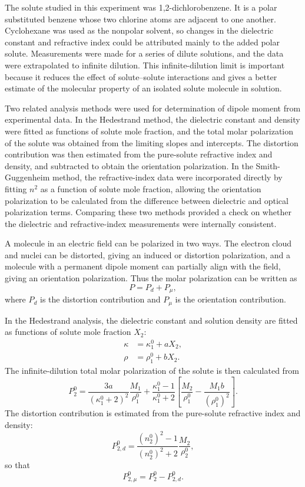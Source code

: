 \documentclass[11pt]{article}
\begin{document}
The solute studied in this experiment was 1,2-dichlorobenzene. It is a polar substituted benzene whose two chlorine atoms are adjacent to one another. Cyclohexane was used as the nonpolar solvent, so changes in the dielectric constant and refractive index could be attributed mainly to the added polar solute. Measurements were made for a series of dilute solutions, and the data were extrapolated to infinite dilution. This infinite-dilution limit is important because it reduces the effect of solute--solute interactions and gives a better estimate of the molecular property of an isolated solute molecule in solution.

Two related analysis methods were used for determination of dipole moment from experimental data. In the Hedestrand method, the dielectric constant and density were fitted as functions of solute mole fraction, and the total molar polarization of the solute was obtained from the limiting slopes and intercepts. The distortion contribution was then estimated from the pure-solute refractive index and density, and subtracted to obtain the orientation polarization. In the Smith-Guggenheim method, the refractive-index data were incorporated directly by fitting $n^2$ as a function of solute mole fraction, allowing the orientation polarization to be calculated from the difference between dielectric and optical polarization terms. Comparing these two methods provided a check on whether the dielectric and refractive-index measurements were internally consistent.

A molecule in an electric field can be polarized in two ways. The electron cloud and nuclei can be distorted, giving an induced or distortion polarization, and a molecule with a permanent dipole moment can partially align with the field, giving an orientation polarization. Thus the molar polarization can be written as
\begin{equation}
P=P_d+P_\mu,
\end{equation}
where $P_d$ is the distortion contribution and $P_\mu$ is the orientation contribution.

In the Hedestrand analysis, the dielectric constant and solution density are fitted as functions of solute mole fraction $X_2$:
\begin{align}
\kappa &= \kappa_1^0+aX_2,\label{eq:kappafit}\\
\rho &= \rho_1^0+bX_2.\label{eq:rhofit}
\end{align}
The infinite-dilution total molar polarization of the solute is then calculated from
\begin{equation}
P_2^0=
\frac{3a}{(\kappa_1^0+2)^2}\frac{M_1}{\rho_1^0}
+
\frac{\kappa_1^0-1}{\kappa_1^0+2}
\left[
\frac{M_2}{\rho_1^0}
-
\frac{M_1b}{(\rho_1^0)^2}
\right].
\label{eq:hedestrand}
\end{equation}
The distortion contribution is estimated from the pure-solute refractive index and density:
\begin{equation}
P_{2,d}^0=
\frac{(n_2^0)^2-1}{(n_2^0)^2+2}\frac{M_2}{\rho_2^0},
\label{eq:distortion}
\end{equation}
so that
\begin{equation}
P_{2,\mu}^0=P_2^0-P_{2,d}^0.
\end{equation}
\end{document}
